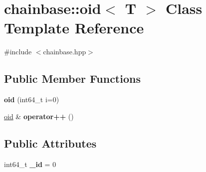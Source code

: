 \hypertarget{classchainbase_1_1oid}{}\section{chainbase\+:\+:oid$<$ T $>$ Class Template Reference}
\label{classchainbase_1_1oid}


{\ttfamily \#include $<$chainbase.\+hpp$>$}

\subsection*{Public Member Functions}
\begin{DoxyCompactItemize}
\item 
\mbox{\label{classchainbase_1_1oid_a58f27e29618d565529b542355c4e9fff}} 
{\bfseries oid} (int64\+\_\+t i=0)
\item 
\mbox{\label{classchainbase_1_1oid_a560dc7b5ebe56e83bc65067119750552}} 
\mbox{\hyperlink{classchainbase_1_1oid}{oid}} \& {\bfseries operator++} ()
\end{DoxyCompactItemize}
\subsection*{Public Attributes}
\begin{DoxyCompactItemize}
\item 
\mbox{\label{classchainbase_1_1oid_a572c4ef080a7db37d93631ab0fbb123a}} 
int64\+\_\+t {\bfseries \+\_\+id} = 0
\end{DoxyCompactItemize}
